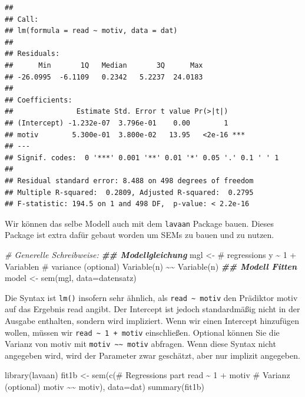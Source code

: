 \documentclass[
]{article}
\newenvironment{Shaded}{\begin{snugshade}}{\end{snugshade}}
\newcommand{\AttributeTok}[1]{\textcolor[rgb]{0.77,0.63,0.00}{#1}}
\newcommand{\CommentTok}[1]{\textcolor[rgb]{0.56,0.35,0.01}{\textit{#1}}}
\newcommand{\DocumentationTok}[1]{\textcolor[rgb]{0.56,0.35,0.01}{\textbf{\textit{#1}}}}
\newcommand{\FunctionTok}[1]{\textcolor[rgb]{0.00,0.00,0.00}{#1}}
\newcommand{\NormalTok}[1]{#1}
\newcommand{\OtherTok}[1]{\textcolor[rgb]{0.56,0.35,0.01}{#1}}
\newcommand{\StringTok}[1]{\textcolor[rgb]{0.31,0.60,0.02}{#1}}
\begin{document}
\begin{verbatim}
## 
## Call:
## lm(formula = read ~ motiv, data = dat)
## 
## Residuals:
##      Min       1Q   Median       3Q      Max 
## -26.0995  -6.1109   0.2342   5.2237  24.0183 
## 
## Coefficients:
##               Estimate Std. Error t value Pr(>|t|)    
## (Intercept) -1.232e-07  3.796e-01    0.00        1    
## motiv        5.300e-01  3.800e-02   13.95   <2e-16 ***
## ---
## Signif. codes:  0 '***' 0.001 '**' 0.01 '*' 0.05 '.' 0.1 ' ' 1
## 
## Residual standard error: 8.488 on 498 degrees of freedom
## Multiple R-squared:  0.2809, Adjusted R-squared:  0.2795 
## F-statistic: 194.5 on 1 and 498 DF,  p-value: < 2.2e-16
\end{verbatim}

Wir können das selbe Modell auch mit dem \texttt{lavaan} Package bauen.
Dieses Package ist extra dafür gebaut worden um SEMs zu bauen und zu
nutzen.

\begin{Shaded}
\begin{Highlighting}[]
\CommentTok{\# Generelle Schreibweise:}
\DocumentationTok{\#\# Modellgleichung}
\NormalTok{mgl }\OtherTok{\textless{}{-}} \StringTok{\textquotesingle{}\# regressions}
\StringTok{       y \textasciitilde{} 1 + Variablen}
\StringTok{       \# variance (optional)}
\StringTok{       Variable(n) \textasciitilde{}\textasciitilde{} Variable(n)\textquotesingle{}}
\DocumentationTok{\#\# Modell Fitten}
\NormalTok{model }\OtherTok{\textless{}{-}} \FunctionTok{sem}\NormalTok{(mgl, }\AttributeTok{data=}\NormalTok{datensatz)}
\end{Highlighting}
\end{Shaded}

Die Syntax ist \texttt{lm()} insofern sehr ähnlich, als
\texttt{read\ \textasciitilde{}\ motiv} den Prädiktor motiv auf das
Ergebnis read angibt. Der Intercept ist jedoch standardmäßig nicht in
der Ausgabe enthalten, sondern wird impliziert. Wenn wir einen Intercept
hinzufügen wollen, müssen wir
\texttt{read\ \textasciitilde{}\ 1\ +\ motiv} einschließen. Optional
können Sie die Varianz von motiv mit
\texttt{motiv\ \textasciitilde{}\textasciitilde{}\ motiv} abfragen. Wenn
diese Syntax nicht angegeben wird, wird der Parameter zwar geschätzt,
aber nur implizit angegeben.

\begin{Shaded}
\begin{Highlighting}[]
\FunctionTok{library}\NormalTok{(lavaan)}
\NormalTok{fit1b }\OtherTok{\textless{}{-}} \FunctionTok{sem}\NormalTok{(}\FunctionTok{c}\NormalTok{(}\StringTok{\textquotesingle{}\# Regressions part}
\StringTok{                read \textasciitilde{} 1 + motiv}
\StringTok{                \# Varianz (optional)}
\StringTok{                motiv \textasciitilde{}\textasciitilde{} motiv\textquotesingle{}}\NormalTok{), }
             \AttributeTok{data=}\NormalTok{dat)}
\FunctionTok{summary}\NormalTok{(fit1b)}
\end{Highlighting}
\end{Shaded}
\end{document}
